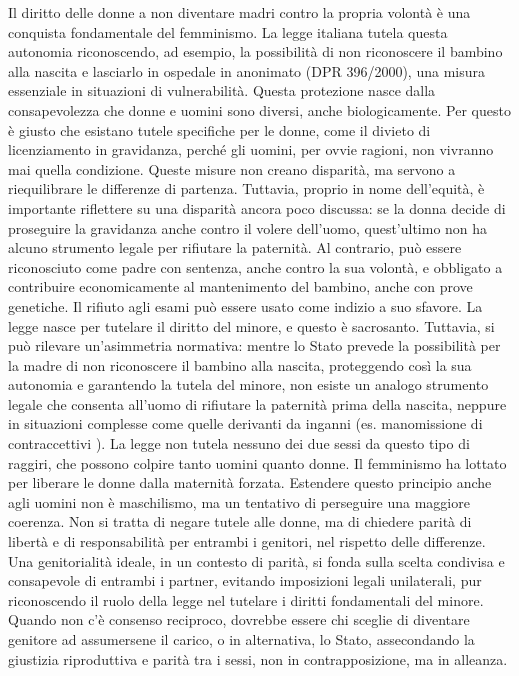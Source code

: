 \documentclass[12pt]{book} %
\begin{document}
\begin{mdframed}[linewidth=1pt]
Il diritto delle donne a non diventare madri contro la propria volontà è una conquista fondamentale del femminismo. La legge italiana tutela questa autonomia riconoscendo, ad esempio, la possibilità di non riconoscere il bambino alla nascita e lasciarlo in ospedale in anonimato (DPR 396/2000), una misura essenziale in situazioni di vulnerabilità.
Questa protezione nasce dalla consapevolezza che donne e uomini sono diversi, anche biologicamente. Per questo è giusto che esistano tutele specifiche per le donne, come il divieto di licenziamento in gravidanza, perché gli uomini, per ovvie ragioni, non vivranno mai quella condizione. Queste misure non creano disparità, ma servono a riequilibrare le differenze di partenza.
Tuttavia, proprio in nome dell’equità, è importante riflettere su una disparità ancora poco discussa: se la donna decide di proseguire la gravidanza anche contro il volere dell’uomo, quest’ultimo non ha alcuno strumento legale per rifiutare la paternità. Al contrario, può essere riconosciuto come padre con sentenza, anche contro la sua volontà, e obbligato a contribuire economicamente al mantenimento del bambino, anche con prove genetiche. Il rifiuto agli esami può essere usato come indizio a suo sfavore.
La legge nasce per tutelare il diritto del minore, e questo è sacrosanto. Tuttavia, si può rilevare un'asimmetria normativa: mentre lo Stato prevede la possibilità per la madre di non riconoscere il bambino alla nascita, proteggendo così la sua autonomia e garantendo la tutela del minore, non esiste un analogo strumento legale che consenta all'uomo di rifiutare la paternità prima della nascita, neppure in situazioni complesse come quelle derivanti da inganni (es. manomissione di contraccettivi ). La legge non tutela nessuno dei due sessi da questo tipo di raggiri, che possono colpire tanto uomini quanto donne.
Il femminismo ha lottato per liberare le donne dalla maternità forzata. Estendere questo principio anche agli uomini non è maschilismo, ma un tentativo di perseguire una maggiore coerenza. Non si tratta di negare tutele alle donne, ma di chiedere parità di libertà e di responsabilità per entrambi i genitori, nel rispetto delle differenze.
Una genitorialità ideale, in un contesto di parità, si fonda sulla scelta condivisa e consapevole di entrambi i partner, evitando imposizioni legali unilaterali, pur riconoscendo il ruolo della legge nel tutelare i diritti fondamentali del minore. Quando non c’è consenso reciproco, dovrebbe essere chi sceglie di diventare genitore ad assumersene il carico, o in alternativa, lo Stato, assecondando la giustizia riproduttiva e parità tra i sessi, non in contrapposizione, ma in alleanza.
\end{mdframed}
\end{document}

